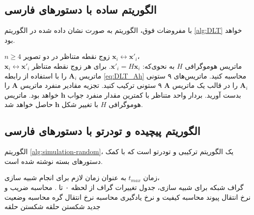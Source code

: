 \subsection{الگوریتم ساده با دستورهای فارسی}
با مفروضات فوق، الگوریتم  به صورت نشان داده شده در الگوریتم \eqref{alg:DLT} خواهد بود.
\begin{algorithm}[ht]
\onehalfspacing
\caption{الگوریتم DLT} \label{alg:DLT}
\begin{algorithmic}[1]
\REQUIRE $n\geq4$ زوج نقطه متناظر در دو تصویر
${\mathbf{x}_i\leftrightarrow\mathbf{x}'_i}$،\\
\ENSURE ماتریس هوموگرافی $H$ به نحوی‌که:
$\mathbf{x}'_i = H \mathbf{x}_i$.
 \STATE برای هر زوج نقطه متناظر
$\mathbf{x}_i\leftrightarrow\mathbf{x}'_i$
ماتریس $\mathbf{A}_i$ را با استفاده از رابطه \ref{eq:DLT_Ah} محاسبه کنید.
 \STATE ماتریس‌های ۹ ستونی $\mathbf{A}_i$ را در قالب یک ماتریس $\mathbf{A}$ ۹ ستونی ترکیب کنید.
 \STATE تجزیه مقادیر منفرد  ماتریس $\mathbf{A}$ را بدست آورید. بردار واحد متناظر با کمترین مقدار منفرد جواب $\mathbf{h}$ خواهد بود.
 \STATE ماتریس هوموگرافی $H$ با تغییر شکل $\mathbf{h}$ حاصل خواهد شد.
\end{algorithmic}
\end{algorithm}

\subsection{الگوریتم پیچیده و تودرتو با دستورهای فارسی}
الگوریتم \ref{alg:simulation-random}، یک الگوریتم ترکیبی و تودرتو است که با کمک دستورهای بسته  نوشته شده است.

\begin{algorithm}[p]
  \onehalfspacing
  \caption{الگوریتم شبیه‌سازی}
  \label{alg:simulation-random}
  \begin{algorithmic}[1]
    \REQUIRE زمان $t_{max}$ به عنوان زمان لازم برای انجام شبیه سازی،\\
    \REQUIRE گراف شبکه برای شبیه سازی،
    \ENSURE جدول تغییرات گراف از لحظه ۰ تا .
        \STATE محاسبه ضریب و نرخ انتقال پیوند
        \STATE محاسبه کیفیت و نرخ یادگیری
      \ENDFOR
        \STATE محاسبه نرخ انتقال گره
        \STATE محاسبه وضعیت جدید
      \ENDFOR
        \STATE شکستن حلقه
        \STATE شکستن حلقه
      \ENDIF
    \ENDFOR
  \end{algorithmic}
\end{algorithm}

